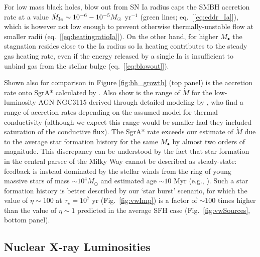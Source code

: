 \documentclass[usenatbib,fleqn]{mn2e}
\begin{document}
For low mass black holes, blow out from SN Ia radius caps the SMBH
accretion rate at a value $\dot{M}_{\rm Ia} \sim
10^{-6}-10^{-5}M_{\odot}$ yr$^{-1}$ (green lines;
eq.~[\ref{eq:eddr_Ia}]), which is however not low enough to prevent
otherwise thermally-unstable flow at smaller radii (eq.~[\ref{eq:heatingratioIa}]).  On the other hand, for higher
$M_{\bullet}$ the stagnation resides close to the Ia radius so Ia
heating contributes to the steady gas heating rate, even if the energy
released by a single Ia is insufficient to unbind gas from the stellar
bulge (eq.~[\ref{eq:blowout}]).


Shown also for comparison in Figure \ref{fig:bh_growth} (top panel) is
the accretion rate onto SgrA* calculated by \citet{Quataert:2004a}.
Also show is the range of $\dot{M}$ for the low-luminosity AGN NGC3115
derived through detailed modeling by \citealt{ShcherbakovWong+:2014a},
who find a range of accretion rates depending on the assumed model for
thermal conductivity (although we expect this range would be smaller
had they included saturation of the conductive flux).  The SgrA* rate
exceeds our estimate of $\dot{M}$ due to the average star formation
history for the same $M_{\bullet}$ by almost two orders of magnitude.
This discrepancy can be understood by the fact that star formation in
the central parsec of the Milky Way cannot be described as
steady-state: feedback is instead dominated by the stellar winds from
the ring of young massive stars of mass $\sim 10^{4}M_{\odot}$ and
estimated age $\sim 10$ Myr (e.g., \citealt{Schodel+07}).  Such a star
formation history is better described by our `star burst' scenario,
for which the value of $\eta \sim 100$ at $\tau_{\star} = 10^{7}$ yr
(Fig.~\ref{fig:vwImp}) is a factor of $\sim 100$ times higher than the
value of $\eta \sim 1$ predicted in the average SFH case
(Fig.~\ref{fig:vwSources}, bottom panel).


\subsection{Nuclear X-ray Luminosities}
\label{sec:Lx}
\end{document}
